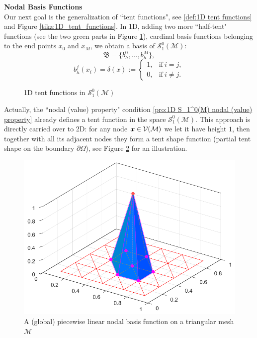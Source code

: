 	\noindent\textbf{Nodal Basis Functions}\\[8pt]		
	Our next goal is the generalization of ``tent functions", see
	\eqref{def:1D tent functions} and Figure \ref{tikz:1D_tent_functions}.
	In 1D, adding two more ``half-tent" functions (see the two 
	\textcolor{mid-green}{green} parts in Figure
	\ref{tikz:1D_tent_functions_in_S_1^0(M)}), cardinal basis functions
	belonging to the end points $x_0$ and $x_M$, we obtain a basis of
	$\mathcal{S}_{1}^{0}(\mathcal{M})$:
	\begin{equation}	
	\mathfrak{B}=\{b_h^0,...,b_h^M\},
	\end{equation}\vspace{-10pt}
	\begin{equation}
	b_h^j(x_i) = \delta(x) := 
	\begin{cases}
	1, 	  & \textrm{if}\  i=j,\\
	0,    & \textrm{if}\  i\neq j.
	\end{cases}	\label{pro:1D S_1^0(M) nodal (value) property}
	\end{equation}
	\begin{figure}[!htbp]
		\centering		
		
		\caption{1D tent functions in $\mathcal{S}_{1}^{0}(\mathcal{M})$}
		\label{tikz:1D_tent_functions_in_S_1^0(M)}
	\end{figure}

	Actually, the ``nodal (value) property" condition 
	\eqref{pro:1D S_1^0(M) nodal (value) property}  already defines a tent 
	function in the space $\mathcal{S}_{1}^{0}(\mathcal{M})$. This approach
	is directly carried over to 2D: for any node 
	$\bm{x}\in\mathcal{V}(\mathcal{M})$ we let it have height $1$, then together 
	with all its adjacent nodes they form a tent shape function (partial tent 
	shape on the boundary $\partial\Omega$), see Figure 
	\ref{fig:2D_nodal_basis_function_example} for an illustration.	
	\begin{figure}[!htbp]
		\centering
		\includegraphics[width=0.7\linewidth]{
			svg/2D_nodal_basis_function_example}
		\caption{A (global) piecewise linear nodal basis function on a
			triangular mesh $\mathcal{M}$  }
		\label{fig:2D_nodal_basis_function_example}
	\end{figure}
	
